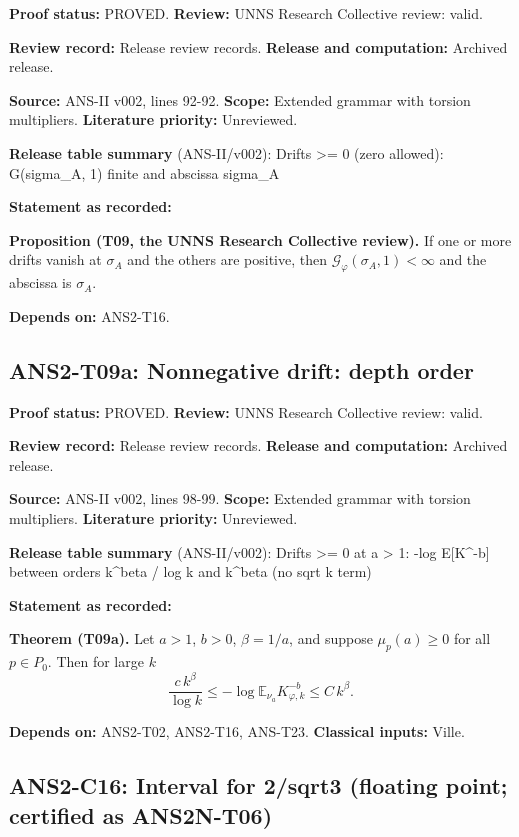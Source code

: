 \documentclass[
  11pt,
]{article}
\begin{document}
\textbf{Proof status:} PROVED. \textbf{Review:} UNNS Research Collective
review: valid.

\textbf{Review record:} Release review records. \textbf{Release and
computation:} Archived release.

\textbf{Source:} ANS-II v002, lines 92-92. \textbf{Scope:} Extended
grammar with torsion multipliers. \textbf{Literature priority:}
Unreviewed.

\textbf{Release table summary} (ANS-II/v002): Drifts \textgreater= 0
(zero allowed): G(sigma\_A, 1) finite and abscissa sigma\_A

\textbf{Statement as recorded:}

\textbf{Proposition (T09, the UNNS Research Collective review).} If one
or more drifts vanish at \(\sigma_A\) and the others are positive, then
\(\mathcal G_\varphi(\sigma_A,1)<\infty\) and the abscissa is
\(\sigma_A\).

\textbf{Depends on:} ANS2-T16.

\hypertarget{ans2-t09a-nonnegative-drift-depth-order}{%
\subsection{ANS2-T09a: Nonnegative drift: depth
order}\label{ans2-t09a-nonnegative-drift-depth-order}}

\textbf{Proof status:} PROVED. \textbf{Review:} UNNS Research Collective
review: valid.

\textbf{Review record:} Release review records. \textbf{Release and
computation:} Archived release.

\textbf{Source:} ANS-II v002, lines 98-99. \textbf{Scope:} Extended
grammar with torsion multipliers. \textbf{Literature priority:}
Unreviewed.

\textbf{Release table summary} (ANS-II/v002): Drifts \textgreater= 0 at
a \textgreater{} 1: -log E{[}K\^{}-b{]} between orders k\^{}beta / log k
and k\^{}beta (no sqrt k term)

\textbf{Statement as recorded:}

\textbf{Theorem (T09a).} Let \(a>1\), \(b>0\), \(\beta=1/a\), and
suppose \(\mu_p(a)\ge0\) for all \(p\in P_0\). Then for large \(k\)
\[\frac{c\,k^\beta}{\log k}\le-\log\mathbb E_{\nu_a}K_{\varphi,k}^{-b}\le C\,k^\beta.\]

\textbf{Depends on:} ANS2-T02, ANS2-T16, ANS-T23. \textbf{Classical
inputs:} Ville.

\hypertarget{ans2-c16-interval-for-2sqrt3-floating-point-certified-as-ans2n-t06}{%
\subsection{ANS2-C16: Interval for 2/sqrt3 (floating point; certified as
ANS2N-T06)}\label{ans2-c16-interval-for-2sqrt3-floating-point-certified-as-ans2n-t06}}
\end{document}

